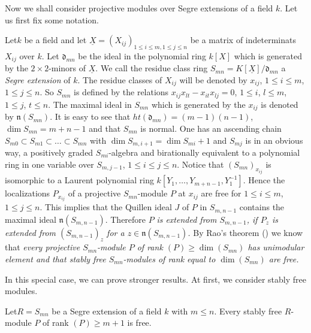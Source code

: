 Now we shall consider projective modules over Segre extensions of a
field $k$. Let us first fix some notation. 

Let\pageoriginale $k$ be a field and let
$\underline{X}=(X_{ij})_{1\leq i\leq m, 1\leq j\leq n}$ be a matrix of
indeterminats $X_{ij}$ over $k$. Let $\mathfrak{d}_{mn}$ be the ideal
in the polynomial ring $k[X]$ which is generated by the $2\times
2$-minors of $\underline{X}$. We call the residue class ring
$S_{mn}=K[\underline{X}]/\mathfrak{d}_{mn}$ a {\em Segre extension} of
$k$. The residue classes of $X_{ij}$ will be denoted by $x_{ij}$,
$1\leq i\leq m$, $1\leq j\leq n$. So $S_{mn}$ is defined by the
relations $x_{ij}x_{lt}-x_{it}x_{lj}=0$, $1\leq i$, $l\leq m$, $1\leq
j$, $t\leq n$. The maximal ideal in $S_{mn}$ which is generated by the
$x_{ij}$ is denoted by $\mathfrak{n}(S_{mn})$. It is easy to see that
$ht(\mathfrak{d}_{mn})=(m-1)(n-1)$, $\dim S_{mn}=m+n-1$ and that
$S_{mn}$ is normal. One has an ascending chain $S_{m0}\subset
S_{m1}\subset\ldots \subset S_{mn}$ with  $\dim S_{m,i+1}=\dim
S_{mi}+1$ and $S_{mj}$ is in an obvious way, a positively graded
$S_{mi}$-algebra and birationally equivalent to a polynomial ring in
one variable over $S_{m,j-1}$, $1\leq i\leq j\leq n$. Notice that
$(S_{mn})_{x_{ij}}$ is isomorphic to a Laurent polynomial ring
$k[Y_{1},\ldots,Y_{m+n-1}, Y^{-1}_{1}]$. Hence the localizations
$P_{x_{ij}}$ of a projective $S_{mn}$-module $P$ at $x_{ij}$ are free
for $1\leq i\leq m$, $1\leq j\leq n$. This implies that the Quillen
ideal $J$ of $P$ in $S_{m,n-1}$ contains the maximal ideal
$\mathfrak{n}(S_{m,n-1})$. Therefore $P$ {\em is extended from
$S_{m,n-1}$, if $P_{z}$ is extended from $(S_{m,n-1})_{z}$ for a
$z\in \mathfrak{n}(S_{m,n-1})$.} By Rao's theorem (\cite[Theorem
1.1]{chap10-Ra}) we know that {\em every projective $S_{mn}$-module
$P$ of rank $(P)\geq \dim (S_{mn})$ has unimodular element and that
stably free $S_{mn}$-modules of rank equal to $\dim (S_{mn})$ are
free.}

In this special case, we can prove stronger results. At first, we
consider stably free modules.

\begin{subthm}\label{chap10-thm2.7}
Let\pageoriginale $R=S_{mn}$ be a Segre extension of a field $k$ with $m\leq
n$. Every stably free $R$-module $P$ of rank $(P)\geq m+1$ is free.
\end{subthm}

